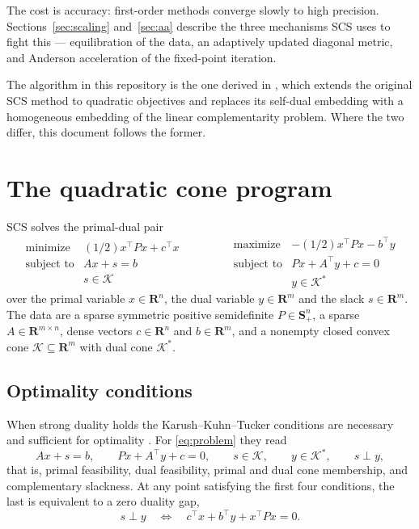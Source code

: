 \documentclass[11pt,a4paper]{article}
\newcommand{\R}{\mathbf{R}}
\newcommand{\Sym}{\mathbf{S}}
\newcommand{\K}{\mathcal{K}}
\newcommand{\tr}{^\top}
\DeclareMathOperator*{\minimize}{minimize}
\DeclareMathOperator*{\maximize}{maximize}
\theoremstyle{plain}
\begin{document}
The cost is accuracy: first-order methods converge slowly to high precision.
Sections~\ref{sec:scaling} and~\ref{sec:aa} describe the three mechanisms SCS
uses to fight this --- equilibration of the data, an adaptively updated
diagonal metric, and Anderson acceleration of the fixed-point iteration.

The algorithm in this repository is the one derived in
\cite{odonoghue:21}, which extends the original SCS
method \cite{ocpb:16} to quadratic objectives and replaces its
self-dual embedding with a homogeneous embedding of the linear complementarity
problem. Where the two differ, this document follows the former.

\section{The quadratic cone program}

SCS solves the primal-dual pair
\begin{equation}\label{eq:problem}
\begin{array}{ll}
\minimize & (1/2)x\tr P x + c\tr x\\
\mbox{subject to} & Ax + s = b\\
                  & s \in \K
\end{array}
\qquad\qquad
\begin{array}{ll}
\maximize & -(1/2)x\tr P x - b\tr y\\
\mbox{subject to} & Px + A\tr y + c = 0\\
                  & y \in \K^*
\end{array}
\end{equation}
over the primal variable $x \in \R^n$, the dual variable $y \in \R^m$ and the
slack $s \in \R^m$. The data are a sparse symmetric positive semidefinite
$P \in \Sym_+^n$, a sparse $A \in \R^{m \times n}$, dense vectors
$c \in \R^n$ and $b \in \R^m$, and a nonempty closed convex cone
$\K \subseteq \R^m$ with dual cone $\K^*$.

\subsection{Optimality conditions}

When strong duality holds the Karush--Kuhn--Tucker conditions are necessary and
sufficient for optimality \cite{boyd:04}. For \eqref{eq:problem} they read
\begin{equation}\label{eq:kkt}
Ax + s = b,\qquad Px + A\tr y + c = 0,\qquad
s \in \K,\qquad y \in \K^*,\qquad s \perp y,
\end{equation}
that is, primal feasibility, dual feasibility, primal and dual cone membership,
and complementary slackness. At any point satisfying the first four conditions,
the last is equivalent to a zero duality gap,
\begin{equation}\label{eq:gap}
s \perp y \quad\Longleftrightarrow\quad c\tr x + b\tr y + x\tr P x = 0 .
\end{equation}
\end{document}
